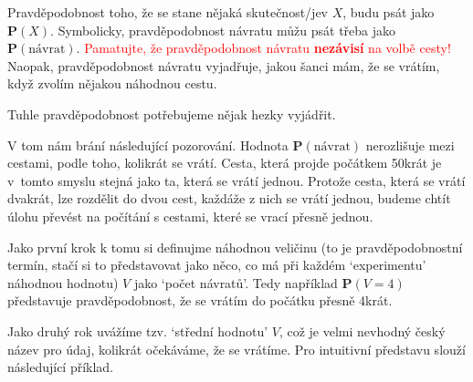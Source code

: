 \documentclass[a4paper,11pt]{article}
\theoremstyle{remark}
\renewcommand{\P}{\mathbf{P}}
\begin{document}
Pravděpodobnost toho, že se stane nějaká skutečnost/jev $X$, budu psát jako
$\P(X)$. Symbolicky, pravděpodobnost návratu můžu psát třeba jako
$\P(\text{návrat})$. \textcolor{red}{Pamatujte, že pravděpodobnost návratu
\textbf{nezávisí} na volbě cesty!} Naopak, prav\-děpodobnost návratu vyjadřuje,
jakou šanci mám, že se vrátím, když zvolím nějakou náhodnou cestu.

Tuhle pravděpodobnost potřebujeme nějak hezky vyjádřit.

V tom nám brání následující pozorování. Hodnota $\P(\text{návrat})$ nerozlišuje
mezi cestami, podle toho, kolikrát se vrátí. Cesta, která projde počátkem 50krát
je v~tomto smyslu stejná jako ta, která se vrátí jednou. Protože cesta, která se
vrátí dvakrát, lze rozdělit do dvou cest, každáže z nich se vrátí jednou, budeme
chtít úlohu převést na počítání s cestami, které se vrací přesně jednou.

Jako první krok k tomu si definujme náhodnou veličinu (to je pravděpodobnostní
termín, stačí si to představovat jako něco, co má při každém `experimentu'
náhodnou hodnotu) $V$ jako `počet návratů'. Tedy například $\P(V=4)$ představuje
pravděpodobnost, že se vrátím do počátku přesně 4krát.

Jako druhý rok uvážíme tzv. `střední hodnotu' $V$, což je velmi nevhodný český
název pro údaj, kolikrát očekáváme, že se vrátíme. Pro intuitivní představu
slouží následující příklad.
\end{document}
